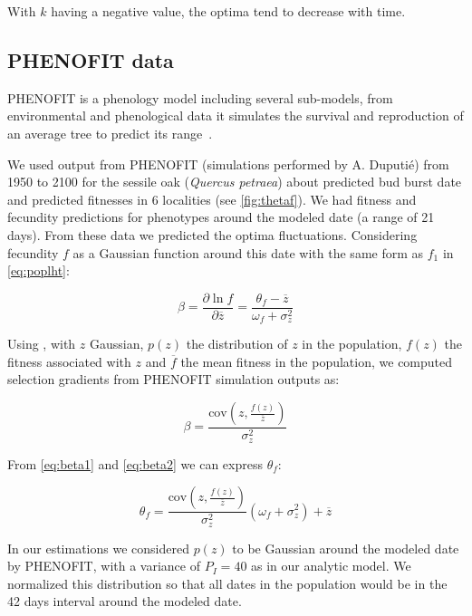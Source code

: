 With $k$ having a negative value, the optima tend to decrease with time.

\subsection*{\textsc{PHENOFIT} data}

\textsc{PHENOFIT} is a phenology model including several sub-models, from environmental and phenological data it simulates the survival and reproduction of an average tree to predict its range~\citep{morin_tree_2008}.

 We used output from \textsc{PHENOFIT} (simulations performed by A. Duputié) from 1950 to 2100 for the sessile oak (\textit{Quercus petraea}) about predicted bud burst date and predicted fitnesses in 6 localities (see \autoref{fig:thetaf}). We had fitness and fecundity predictions for phenotypes around the modeled date (a range of 21 days). From these data we predicted the optima fluctuations. Considering fecundity $f$ as a Gaussian function around this date with the same form as $f_1$ in \autoref{eq:poplht}:

\begin{equation}
	\label{eq:beta1}
	\beta = \frac{\partial \ln f}{\partial \overline{z}} = \frac{\theta_f - \overline{z}}{\omega_f + \sigma_z^2}
\end{equation}

Using \citep{lande_measurement_1983}, with $z$ Gaussian, $p(z)$ the distribution of $z$ in the population, $f(z)$ the fitness associated with $z$ and $\overline{f}$ the mean fitness in the population, we computed selection gradients from PHENOFIT simulation outputs as:

\begin{equation}
	\label{eq:beta2}
	\beta = \frac{\text{cov}(z, \frac{f(z)}{\overline{z}})}{\sigma_z^2}
\end{equation}

From \eqref{eq:beta1} and \eqref{eq:beta2} we can express $\theta_f$:

\begin{equation}
	\theta_f = \frac{\text{cov}(z, \frac{f(z)}{\overline{z}})}{\sigma_z^2} (\omega_f + \sigma_z^2) + \overline{z}
\end{equation}

In our estimations we considered $p(z)$ to be Gaussian around the modeled date by \textsc{PHENOFIT}, with a variance of $P_I=40$ as in our analytic model. We normalized this distribution so that all dates in the population would be in the 42 days interval around the modeled date.

